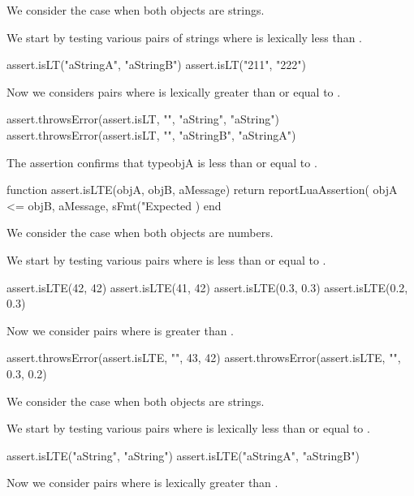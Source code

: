 
We consider the case when both objects are strings. 

We start by testing various pairs of strings where  is 
lexically less than . 

\startLuaTest
  assert.isLT("aStringA", "aStringB")
  assert.isLT("211", "222")
\stopLuaTest

Now we considers pairs where  is lexically greater than or 
equal to . 

\startLuaTest
  assert.throwsError(assert.isLT, "", "aString", "aString")
  assert.throwsError(assert.isLT, "", "aStringB", "aStringA")
\stopLuaTest
\stopTestCase

\stopTestSuite


The  assertion confirms that type{objA} is less than or 
equal to . 

\startLuaCode
function assert.isLTE(objA, objB, aMessage)
  return reportLuaAssertion(
    objA <= objB,
    aMessage,
    sFmt("Expected %
  )
end
\stopLuaCode



We consider the case when both objects are numbers. 

We start by testing various pairs where  is less than or equal 
to . 

\startLuaTest
  assert.isLTE(42, 42)
  assert.isLTE(41, 42)
  assert.isLTE(0.3, 0.3)
  assert.isLTE(0.2, 0.3)
\stopLuaTest

Now we consider pairs where  is greater than . 

\startLuaTest
  assert.throwsError(assert.isLTE, "", 43, 42)
  assert.throwsError(assert.isLTE, "", 0.3, 0.2)
\stopLuaTest
\stopTestCase


We consider the case when both objects are strings.

We start by testing various pairs where  is lexically less than 
or equal to . 

\startLuaTest
  assert.isLTE("aString", "aString")
  assert.isLTE("aStringA", "aStringB")
\stopLuaTest

Now we consider pairs where  is lexically greater than 
. 

